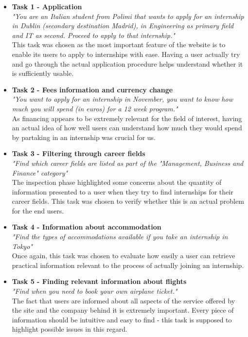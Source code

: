 \documentclass[11pt]{article} %
\begin{document}
\begin{itemize}
    \item \textbf{Task 1 - Application} \\
    \textit{"You are an Italian student from Polimi that wants to apply for an internship in Dublin (secondary destination Madrid), in Engineering as primary field and IT as second. Proceed to apply to that internship."} \\
    This task was chosen as the most important feature of the website is to enable its users to apply to internships with ease. Having a user actually try and go through the actual application procedure helps understand whether it is sufficiently usable. 
    \item \textbf{Task 2 - Fees information and currency change} \\
    \textit{"You want to apply for an internship in November, you want to know how much you will spend (in euros) for a 12 week program."}\\
    As financing appears to be extremely relevant for the field of interest, having an actual idea of how well users can understand how much they would spend by partaking in an internship was crucial for us. 
    \item \textbf{Task 3 - Filtering through career fields} \\
    \textit{"Find which career fields are listed as part of the "Management, Business and Finance" category"}\\
    The inspection phase highlighted some concerns about the quantity of information presented to a user when they try to find internships for their career fields. This task was chosen to verify whether this is an actual problem for the end users. 
    \item \textbf{Task 4 - Information about accommodation} \\
    \textit{"Find the types of accommodations available if you take an internship in Tokyo"}\\
    Once again, this task was chosen to evaluate how easily a user can retrieve practical information relevant to the process of actually joining an internship.
    \item \textbf{Task 5 - Finding relevant information about flights} \\
    \textit{"Find when you need to book your own airplane ticket."}\\
    The fact that users are informed about all aspects of the service offered by the site and the company behind it is extremely important. Every piece of information should be intuitive and easy to find - this task is supposed to highlight possible issues in this regard.

\end{itemize}
\end{document}
